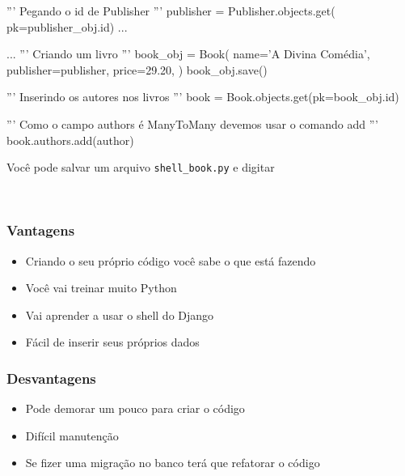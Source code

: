 \documentclass{beamer}
\begin{document}
{\begin{frame}[fragile]
\begin{bashcode}
''' Pegando o id de Publisher '''
publisher = Publisher.objects.get(
    pk=publisher_obj.id)
...
\end{bashcode}
\end{frame}

\begin{frame}[fragile]

\begin{bashcode}
	...
	''' Criando um livro '''
	book_obj = Book(
	    name='A Divina Comédia',
	    publisher=publisher,
	    price=29.20,
	)
	book_obj.save()

	''' Inserindo os autores nos livros '''
	book = Book.objects.get(pk=book_obj.id)

	''' Como o campo authors é ManyToMany devemos usar o comando add '''
	book.authors.add(author)
\end{bashcode}
\end{frame}


\begin{frame}[fragile]

Você pode salvar um arquivo \texttt{shell\_book.py} e digitar

\


\end{frame}


\begin{frame}\frametitle{Vantagens}

\begin{itemize}
	\item Criando o seu próprio código você sabe o que está fazendo
	\item Você vai treinar muito Python
	\item Vai aprender a usar o shell do Django
	\item Fácil de inserir seus próprios dados
\end{itemize}

\end{frame}


\begin{frame}\frametitle{Desvantagens}

\begin{itemize}
	\item Pode demorar um pouco para criar o código
	\item Difícil manutenção
	\item Se fizer uma migração no banco terá que refatorar o código
\end{itemize}


\end{frame}}
\end{document}
